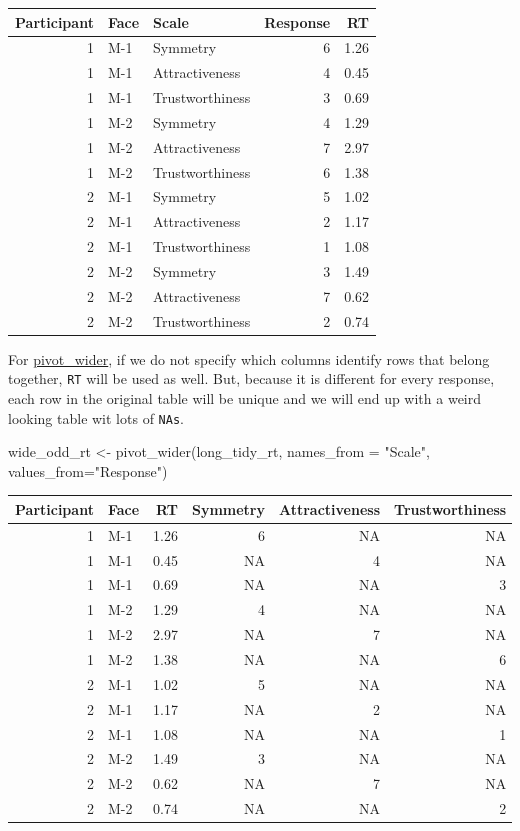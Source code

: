 \documentclass[
]{book}
\newenvironment{Shaded}{\begin{snugshade}}{\end{snugshade}}
\newcommand{\AttributeTok}[1]{\textcolor[rgb]{0.77,0.63,0.00}{#1}}
\newcommand{\FunctionTok}[1]{\textcolor[rgb]{0.00,0.00,0.00}{#1}}
\newcommand{\NormalTok}[1]{#1}
\newcommand{\OtherTok}[1]{\textcolor[rgb]{0.56,0.35,0.01}{#1}}
\newcommand{\StringTok}[1]{\textcolor[rgb]{0.31,0.60,0.02}{#1}}
\begin{document}
\begin{tabular}{r|l|l|r|r}
\hline
Participant & Face & Scale & Response & RT\\
\hline
1 & M-1 & Symmetry & 6 & 1.26\\
\hline
1 & M-1 & Attractiveness & 4 & 0.45\\
\hline
1 & M-1 & Trustworthiness & 3 & 0.69\\
\hline
1 & M-2 & Symmetry & 4 & 1.29\\
\hline
1 & M-2 & Attractiveness & 7 & 2.97\\
\hline
1 & M-2 & Trustworthiness & 6 & 1.38\\
\hline
2 & M-1 & Symmetry & 5 & 1.02\\
\hline
2 & M-1 & Attractiveness & 2 & 1.17\\
\hline
2 & M-1 & Trustworthiness & 1 & 1.08\\
\hline
2 & M-2 & Symmetry & 3 & 1.49\\
\hline
2 & M-2 & Attractiveness & 7 & 0.62\\
\hline
2 & M-2 & Trustworthiness & 2 & 0.74\\
\hline
\end{tabular}

For \href{https://tidyr.tidyverse.org/reference/pivot_wider.html}{pivot\_wider}, if we do not specify which columns identify rows that belong together, \texttt{RT} will be used as well. But, because it is different for every response, each row in the original table will be unique and we will end up with a weird looking table wit lots of \texttt{NAs}.

\begin{Shaded}
\begin{Highlighting}[]
\NormalTok{wide\_odd\_rt }\OtherTok{\textless{}{-}}
  \FunctionTok{pivot\_wider}\NormalTok{(long\_tidy\_rt, }\AttributeTok{names\_from =} \StringTok{"Scale"}\NormalTok{, }\AttributeTok{values\_from=}\StringTok{"Response"}\NormalTok{)}
\end{Highlighting}
\end{Shaded}

\begin{tabular}{r|l|r|r|r|r}
\hline
Participant & Face & RT & Symmetry & Attractiveness & Trustworthiness\\
\hline
1 & M-1 & 1.26 & 6 & NA & NA\\
\hline
1 & M-1 & 0.45 & NA & 4 & NA\\
\hline
1 & M-1 & 0.69 & NA & NA & 3\\
\hline
1 & M-2 & 1.29 & 4 & NA & NA\\
\hline
1 & M-2 & 2.97 & NA & 7 & NA\\
\hline
1 & M-2 & 1.38 & NA & NA & 6\\
\hline
2 & M-1 & 1.02 & 5 & NA & NA\\
\hline
2 & M-1 & 1.17 & NA & 2 & NA\\
\hline
2 & M-1 & 1.08 & NA & NA & 1\\
\hline
2 & M-2 & 1.49 & 3 & NA & NA\\
\hline
2 & M-2 & 0.62 & NA & 7 & NA\\
\hline
2 & M-2 & 0.74 & NA & NA & 2\\
\hline
\end{tabular}
\end{document}
